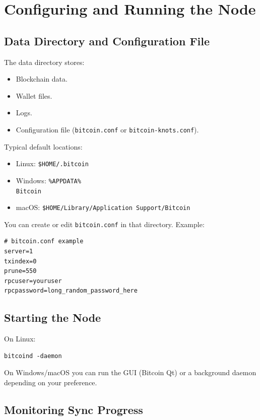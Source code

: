 \documentclass[12pt,a4paper]{book}
\begin{document}
\chapter{Configuring and Running the Node}

\section{Data Directory and Configuration File}

The data directory stores:
\begin{itemize}
  \item Blockchain data.
  \item Wallet files.
  \item Logs.
  \item Configuration file (\texttt{bitcoin.conf} or \texttt{bitcoin-knots.conf}).
\end{itemize}

Typical default locations:

\begin{itemize}
  \item Linux: \texttt{\$HOME/.bitcoin}
  \item Windows: \texttt{\%APPDATA\%\\Bitcoin}
  \item macOS: \texttt{\$HOME/Library/Application Support/Bitcoin}
\end{itemize}

You can create or edit \texttt{bitcoin.conf} in that directory. Example:

\begin{lstlisting}[style=bashstyle]
# bitcoin.conf example
server=1
txindex=0
prune=550
rpcuser=youruser
rpcpassword=long_random_password_here
\end{lstlisting}

\section{Starting the Node}

On Linux:

\begin{lstlisting}[style=bashstyle]
bitcoind -daemon
\end{lstlisting}

On Windows/macOS you can run the GUI (Bitcoin Qt) or a background daemon depending on your preference.

\section{Monitoring Sync Progress}
\end{document}
